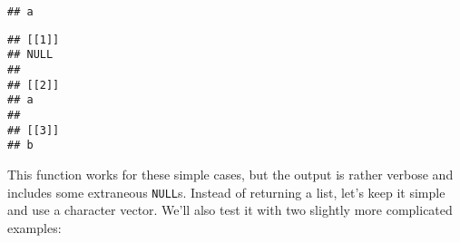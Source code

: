 \begin{Shaded}
\begin{Highlighting}[]
\StringTok{ }
  \NormalTok{ (}\OperatorTok{||}\StringTok{ }
\NormalTok{  \} } \NormalTok{ (}
    \NormalTok{ (}\NormalTok{(x[[}\NormalTok{]], }\NormalTok{(}\DataTypeTok{<-}\NormalTok{))) \{}
\NormalTok{      x[[}\NormalTok{]]}
\NormalTok{    \} }\NormalTok{ \{}
\NormalTok{    \}}
\NormalTok{  \} } \NormalTok{ (}
\NormalTok{  \} }\NormalTok{ \{}
    \NormalTok{(}\NormalTok{, }
       \NormalTok{)}
\NormalTok{  \}}
\NormalTok{\}}
\NormalTok{(}\StringTok{ }\NormalTok{))}
\end{Highlighting}
\end{Shaded}

\begin{verbatim}
## a
\end{verbatim}

\begin{Shaded}
\begin{Highlighting}[]
\NormalTok{(}\NormalTok{(\{}
\StringTok{ }
\StringTok{ }
\NormalTok{\}))}
\end{Highlighting}
\end{Shaded}

\begin{verbatim}
## [[1]]
## NULL
## 
## [[2]]
## a
## 
## [[3]]
## b
\end{verbatim}

This function works for these simple cases, but the output is rather
verbose and includes some extraneous \texttt{NULL}s. Instead of
returning a list, let's keep it simple and use a character vector. We'll
also test it with two slightly more complicated examples:

